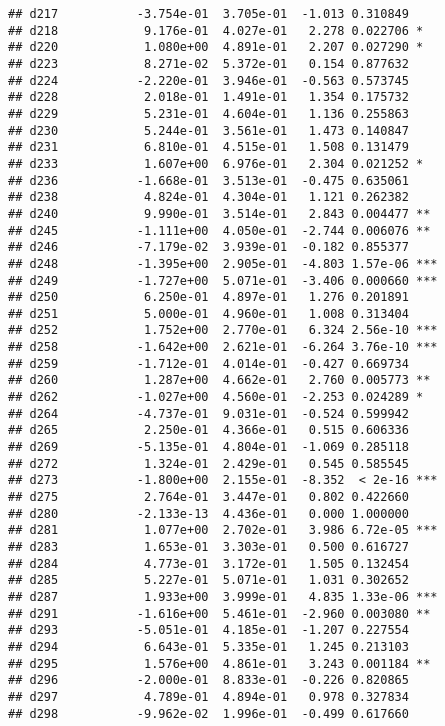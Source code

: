 \documentclass[
]{article}
\begin{document}
\begin{verbatim}
## d217           -3.754e-01  3.705e-01  -1.013 0.310849    
## d218            9.176e-01  4.027e-01   2.278 0.022706 *  
## d220            1.080e+00  4.891e-01   2.207 0.027290 *  
## d223            8.271e-02  5.372e-01   0.154 0.877632    
## d224           -2.220e-01  3.946e-01  -0.563 0.573745    
## d228            2.018e-01  1.491e-01   1.354 0.175732    
## d229            5.231e-01  4.604e-01   1.136 0.255863    
## d230            5.244e-01  3.561e-01   1.473 0.140847    
## d231            6.810e-01  4.515e-01   1.508 0.131479    
## d233            1.607e+00  6.976e-01   2.304 0.021252 *  
## d236           -1.668e-01  3.513e-01  -0.475 0.635061    
## d238            4.824e-01  4.304e-01   1.121 0.262382    
## d240            9.990e-01  3.514e-01   2.843 0.004477 ** 
## d245           -1.111e+00  4.050e-01  -2.744 0.006076 ** 
## d246           -7.179e-02  3.939e-01  -0.182 0.855377    
## d248           -1.395e+00  2.905e-01  -4.803 1.57e-06 ***
## d249           -1.727e+00  5.071e-01  -3.406 0.000660 ***
## d250            6.250e-01  4.897e-01   1.276 0.201891    
## d251            5.000e-01  4.960e-01   1.008 0.313404    
## d252            1.752e+00  2.770e-01   6.324 2.56e-10 ***
## d258           -1.642e+00  2.621e-01  -6.264 3.76e-10 ***
## d259           -1.712e-01  4.014e-01  -0.427 0.669734    
## d260            1.287e+00  4.662e-01   2.760 0.005773 ** 
## d262           -1.027e+00  4.560e-01  -2.253 0.024289 *  
## d264           -4.737e-01  9.031e-01  -0.524 0.599942    
## d265            2.250e-01  4.366e-01   0.515 0.606336    
## d269           -5.135e-01  4.804e-01  -1.069 0.285118    
## d272            1.324e-01  2.429e-01   0.545 0.585545    
## d273           -1.800e+00  2.155e-01  -8.352  < 2e-16 ***
## d275            2.764e-01  3.447e-01   0.802 0.422660    
## d280           -2.133e-13  4.436e-01   0.000 1.000000    
## d281            1.077e+00  2.702e-01   3.986 6.72e-05 ***
## d283            1.653e-01  3.303e-01   0.500 0.616727    
## d284            4.773e-01  3.172e-01   1.505 0.132454    
## d285            5.227e-01  5.071e-01   1.031 0.302652    
## d287            1.933e+00  3.999e-01   4.835 1.33e-06 ***
## d291           -1.616e+00  5.461e-01  -2.960 0.003080 ** 
## d293           -5.051e-01  4.185e-01  -1.207 0.227554    
## d294            6.643e-01  5.335e-01   1.245 0.213103    
## d295            1.576e+00  4.861e-01   3.243 0.001184 ** 
## d296           -2.000e-01  8.833e-01  -0.226 0.820865    
## d297            4.789e-01  4.894e-01   0.978 0.327834    
## d298           -9.962e-02  1.996e-01  -0.499 0.617660    

\end{verbatim}
\end{document}
